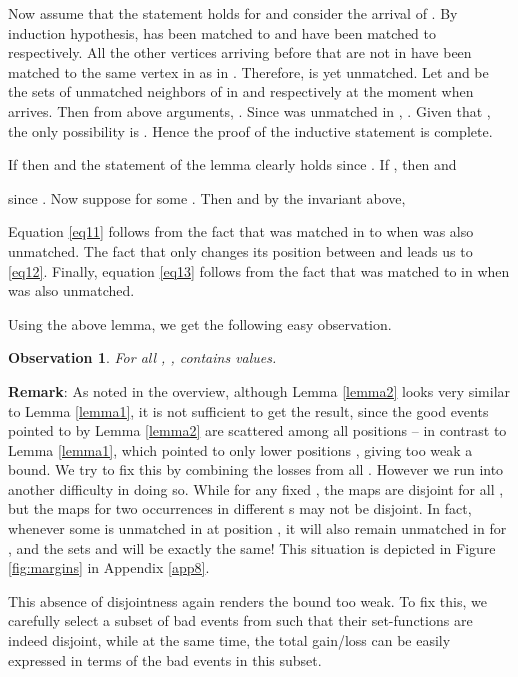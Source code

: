 \documentclass[11pt]{article}
\newtheorem{observation}{Observation}
\newcommand{\qed}{}
\newenvironment{proof}{\noindent{\em Proof:}}{\hfill \qed \medskip}
\begin{document}
\begin{proof}
Now assume that the statement holds for  and consider the arrival
of . By induction hypothesis,  has been matched to  and
 have been matched to 
respectively. All the other vertices arriving before  that are
not in  have been matched to the same vertex in  as in
. Therefore,  is yet unmatched. Let 
and  be the sets of unmatched neighbors of 
in  and  respectively at the moment when 
arrives. Then from above arguments, . Since  was
unmatched in , . Given that , the
only possibility is . Hence the proof of the inductive
statement is complete.

If  then  and
the statement of the lemma clearly holds since . If , then  and

since . Now suppose  for some . Then  and by the invariant above,


Equation \eqref{eq11} follows from the fact that  was matched in
 to  when  was also unmatched. The fact that
only  changes its position between  and  leads us
to \eqref{eq12}. Finally, equation \eqref{eq13} follows from the fact
that  was matched to  in  when  was also
unmatched.
\end{proof}



Using the above lemma, we get the following easy observation.
\begin{observation}
\label{obsk}
For all , , 
contains  values.
\end{observation}


\textbf{Remark}: As noted in the overview, although Lemma \ref{lemma2}
looks very similar to Lemma \ref{lemma1}, it is not sufficient to get
the result, since the good events pointed to by Lemma \ref{lemma2} are
scattered among all positions  -- in contrast to
Lemma \ref{lemma1}, which pointed to only lower positions ,
giving too weak a bound. We try to fix this by combining the losses
from all . However we run into another difficulty in doing
so. While for any fixed , the maps  are disjoint
for all , but the maps for two occurrences in
different s may not be disjoint.
In fact, whenever some  is unmatched in  at position
, it will also remain unmatched in  for
, and the sets  and  will
be exactly the same! This situation is depicted in Figure \ref{fig:margins} in Appendix \ref{app8}.


This absence of disjointness again renders the bound too weak. To fix this, we carefully select a subset of bad events
from  such that their set-functions are indeed
disjoint, while at the same time, the total gain/loss can be easily
expressed in terms of the bad events in this subset.
   
\end{document}
